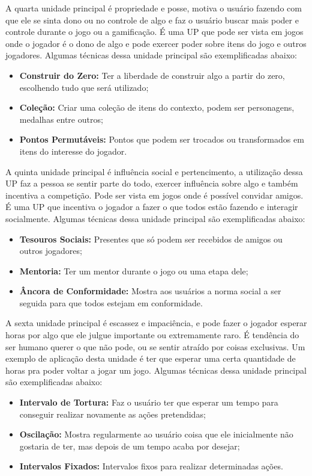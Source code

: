 A quarta unidade principal é propriedade e posse, motiva o usuário fazendo com que ele se sinta dono ou no controle de algo e faz o usuário buscar mais poder e controle durante o jogo ou a gamificação. É uma UP que pode ser vista em jogos onde o jogador é o dono de algo e pode exercer poder sobre itens do jogo e outros jogadores. Algumas técnicas dessa unidade principal são exemplificadas abaixo:

\begin{itemize}
\item  \textbf{Construir do Zero:} Ter a liberdade de construir algo a partir do zero, escolhendo tudo que será utilizado;
\item  \textbf{Coleção:} Criar uma coleção de itens do contexto, podem ser personagens, medalhas entre outros;
\item  \textbf{Pontos Permutáveis:} Pontos que podem ser trocados ou transformados em itens do interesse do jogador.
\end{itemize}

A quinta unidade principal é influência social e pertencimento, a utilização dessa UP faz a pessoa se sentir parte do todo, exercer influência sobre algo e também incentiva a competição. Pode ser vista em jogos onde é possível convidar amigos. É uma UP que incentiva o jogador a fazer o que todos estão fazendo e interagir socialmente. Algumas técnicas dessa unidade principal são exemplificadas abaixo:

\begin{itemize}
\item  \textbf{Tesouros Sociais:} Presentes que só podem ser recebidos de amigos ou outros jogadores;
\item  \textbf{Mentoria:} Ter um mentor durante o jogo ou uma etapa dele;
\item  \textbf{Âncora de Conformidade:} Mostra aos usuários a norma social a ser seguida para que todos estejam em conformidade.
\end{itemize}

A sexta unidade principal é escassez e impaciência, e pode fazer o jogador esperar horas por algo que ele julgue importante ou extremamente raro. É tendência do ser humano querer o que não pode, ou se sentir atraído por coisas exclusivas. Um exemplo de aplicação desta unidade é ter que esperar uma certa quantidade de horas pra poder voltar a jogar um jogo. Algumas técnicas dessa unidade principal são exemplificadas abaixo:

\begin{itemize}
\item  \textbf{Intervalo de Tortura:} Faz o usuário ter que esperar um tempo para conseguir realizar novamente as ações pretendidas;
\item  \textbf{Oscilação:} Mostra regularmente ao usuário coisa que ele inicialmente não gostaria de ter, mas depois de um tempo acaba por desejar;
\item  \textbf{Intervalos Fixados:} Intervalos fixos para realizar determinadas ações.
\end{itemize}

